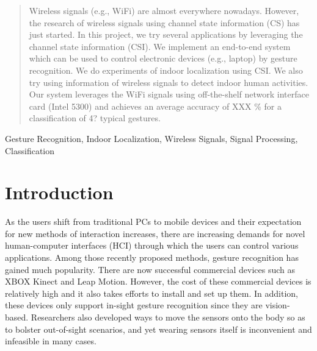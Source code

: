 \documentclass[conference]{IEEEtran}
\begin{document}
\begin{abstract}
Wireless signals (e.g., WiFi) are almost everywhere nowadays. However, the research of wireless signals using channel state information (CS) has just started. In this project, we try several applications by leveraging the channel state information (CSI). We implement an end-to-end system which can be used to control electronic devices (e.g., laptop) by gesture recognition. We do experiments of indoor localization  using CSI. We also try using information of wireless signals to detect indoor human activities. Our system leverages the WiFi signals using off-the-shelf network interface card (Intel 5300) and achieves an average accuracy of XXX \% for a classification of 4? typical gestures.   

\end{abstract}


\begin{keywords}
Gesture Recognition, Indoor Localization, Wireless Signals, Signal Processing, Classification
\end{keywords}


%
\IEEEpeerreviewmaketitle

\section{Introduction}
As the users shift from traditional PCs to mobile devices and their expectation for new methods of interaction increases, there are increasing demands for novel human-computer interfaces (HCI) through which the users can control various applications.
Among those recently proposed methods, gesture recognition has gained much popularity. There are now successful commercial devices such as XBOX Kinect and Leap Motion. 
However, the cost of these commercial devices is relatively high and it also takes efforts to install and set up them.
In addition, these devices only support in-sight gesture recognition since they are vision-based.
Researchers also developed ways to move the sensors onto the body so as to bolster out-of-sight scenarios, and yet wearing sensors itself is inconvenient and infeasible in many cases.
\end{document}
